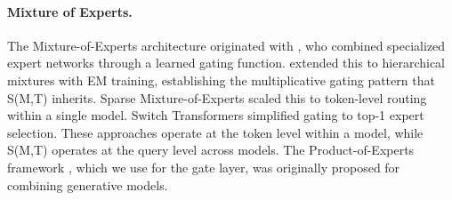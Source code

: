 \paragraph{Mixture of Experts.}
The Mixture-of-Experts architecture originated with \citet{jacobs1991adaptive}, who combined specialized expert networks through a learned gating function. \citet{jordan1994hierarchical} extended this to hierarchical mixtures with EM training, establishing the multiplicative gating pattern that S(M,T) inherits. Sparse Mixture-of-Experts \citep{shazeer2017outrageously} scaled this to token-level routing within a single model. Switch Transformers \citep{fedus2022switch} simplified gating to top-1 expert selection. These approaches operate at the token level within a model, while S(M,T) operates at the query level across models. The Product-of-Experts framework \citep{hinton2002poe}, which we use for the gate layer, was originally proposed for combining generative models.

